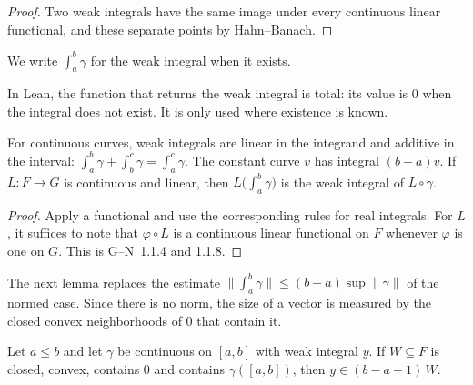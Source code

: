 \begin{proof}
  \leanok
  Two weak integrals have the same image under every continuous linear functional, and these
  separate points by Hahn--Banach.
\end{proof}

We write $\int_a^b \gamma$ for the weak integral when it exists.

\begin{remark}
  In Lean, the function that returns the weak integral is total: its value is $0$ when the
  integral does not exist. It is only used where existence is known.
\end{remark}

\begin{lemma}
  \label{lem:weak-integral-algebra}
  \leanok
  For continuous curves, weak integrals are linear in the integrand and additive in the
  interval: $\int_a^b \gamma + \int_b^c \gamma = \int_a^c \gamma$. The constant curve $v$ has
  integral $(b - a)v$. If $L \colon F \to G$ is continuous and linear, then
  $L\bigl(\int_a^b \gamma\bigr)$ is the weak integral of $L \circ \gamma$.
\end{lemma}

\begin{proof}
  \leanok
  Apply a functional and use the corresponding rules for real integrals. For $L$, it suffices
  to note that $\varphi \circ L$ is a continuous linear functional on $F$ whenever $\varphi$ is
  one on $G$. This is G--N~1.1.4 and 1.1.8.
\end{proof}

The next lemma replaces the estimate $\|\int_a^b \gamma\| \leq (b - a) \sup \|\gamma\|$ of
the normed case. Since there is no norm, the size of a vector is measured by the closed convex
neighborhoods of $0$ that contain it.

\begin{lemma}
  \label{lem:weak-integral-small}
  \leanok
  Let $a \leq b$ and let $\gamma$ be continuous on $[a, b]$ with weak integral $y$. If
  $W \subseteq F$ is closed, convex, contains $0$ and contains $\gamma([a, b])$, then
  $y \in (b - a + 1)\, W$.
\end{lemma}

